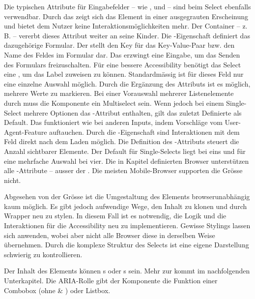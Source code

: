 Die typischen Attribute für Eingabefelder – wie ,  und  – sind beim Select ebenfalls verwendbar. 
Durch das  zeigt sich das Element in einer ausgegrauten Erscheinung und bietet dem Nutzer keine Interaktionsmöglichkeiten mehr. 
Der Container – z. B.  – vererbt dieses Attribut weiter an seine Kinder. 
Die -Eigenschaft definiert das dazugehörige Formular. 
Der  stellt den Key für das Key-Value-Paar bzw. den Name des Feldes im Formular dar. 
Das  erzwingt eine Eingabe, um das Senden des Formulars freizuschalten. 
Für eine bessere Accessibility benötigt das Select eine , um das Label zuweisen zu können. 
Standardmässig ist für dieses Feld nur eine einzelne Auswahl möglich. 
Durch die Ergänzung des Attributs  ist es möglich, mehrere Werte zu markieren. 
Bei einer Vorauswahl mehrerer Listenelemente durch  muss die Komponente ein Multiselect sein. 
Wenn jedoch bei einem Single-Select mehrere Optionen das -Attribut enthalten, gilt das zuletzt Definierte als Default.
Das  funktioniert wie bei anderen Inputs, indem Vorschläge vom User-Agent-Feature auftauchen. 
Durch die -Eigenschaft sind Interaktionen mit dem Feld direkt nach dem Laden möglich. 
Die Definition des -Attributs steuert die Anzahl sichtbarer Elemente. 
Der Default für Single-Selects liegt bei eins und für eine mehrfache Auswahl bei vier. 
Die in Kapitel \textbf{} definierten Browser unterstützen alle -Attribute – ausser der .
Die meisten Mobile-Browser supporten die Grösse nicht. 

Abgesehen von der Grösse ist die Umgestaltung des Elements browserunabhängig kaum möglich. 
Es gibt jedoch aufwendige Wege, den Inhalt zu klonen und durch Wrapper neu zu stylen. 
In diesem Fall ist es notwendig, die Logik und die Interaktionen für die Accessibility neu zu implementieren. 
Gewisse Stylings lassen sich anwenden, wobei aber nicht alle Browser diese in derselben Weise übernehmen. 
Durch die komplexe Struktur des Selects ist eine eigene Darstellung schwierig zu kontrollieren. 

Der Inhalt des Elements können s oder s sein. 
Mehr zur  kommt im nachfolgenden Unterkapitel. 
Die ARIA-Rolle gibt der Komponente die Funktion einer Combobox (ohne  \& ) oder Listbox. 

